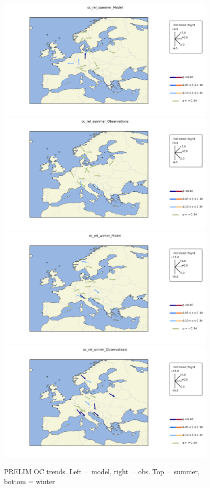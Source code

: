 \begin{figure}
\includegraphics*[height=6cm,trim=1cm 0 0 0]{FIGS_TRENDS/Plot_oc_rel_summer_Model.png}%
\includegraphics*[height=6cm,trim=2cm 0 2cm 0]{FIGS_TRENDS/Plot_oc_rel_summer_Observations.png}
\\
\includegraphics*[height=6cm,trim=1cm 0 0 0]{FIGS_TRENDS/Plot_oc_rel_winter_Model.png}%
\includegraphics*[height=6cm,trim=2cm 0 2.5cm 0]{FIGS_TRENDS/Plot_oc_rel_winter_Observations.png}
\caption{PRELIM OC trends. Left = model, right = obs. Top = summer, bottom = winter
 \label{fig:OCarrows}}
\end{figure}



